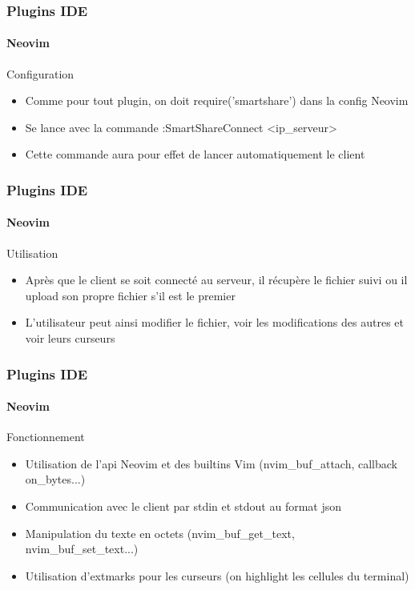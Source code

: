 \documentclass{beamer}
\begin{document}
\begin{frame}
    \frametitle{Plugins IDE}
    \framesubtitle{Neovim}
    \begin{block}{Configuration}
        \begin{itemize}
            \item Comme pour tout plugin, on doit require('smartshare') dans la config Neovim
            \item Se lance avec la commande :SmartShareConnect <ip\_serveur>
            \item Cette commande aura pour effet de lancer automatiquement le client
        \end{itemize}
    \end{block}
\end{frame}

\begin{frame}
    \frametitle{Plugins IDE}
    \framesubtitle{Neovim}
    \begin{block}{Utilisation}
        \begin{itemize}
            \item Après que le client se soit connecté au serveur, il récupère le fichier suivi ou il upload son propre fichier s'il est le premier
            \item L'utilisateur peut ainsi modifier le fichier, voir les modifications des autres et voir leurs curseurs
        \end{itemize}
    \end{block}
\end{frame}

\begin{frame}
    \frametitle{Plugins IDE}
    \framesubtitle{Neovim}
    \begin{block}{Fonctionnement}
        \begin{itemize}
            \item Utilisation de l'api Neovim et des builtins Vim (nvim\_buf\_attach, callback on\_bytes...)
            \item Communication avec le client par stdin et stdout au format json
            \item Manipulation du texte en octets (nvim\_buf\_get\_text, nvim\_buf\_set\_text...)
            \item Utilisation d'extmarks pour les curseurs (on highlight les cellules du terminal)
        \end{itemize}
    \end{block}
\end{frame}
\end{document}
